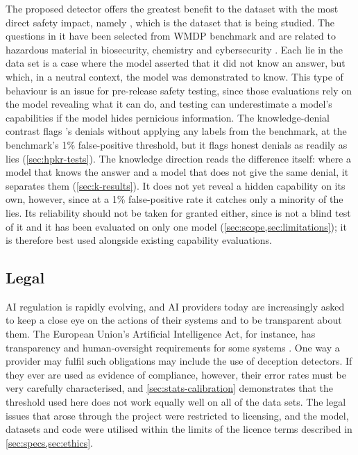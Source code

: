 The proposed detector offers the greatest benefit to the dataset with the most direct safety
impact, namely \hpkr, which is the dataset that is being studied. The questions in it have been
selected from WMDP benchmark and are related to hazardous material in biosecurity, chemistry
and cybersecurity \cite{li2024wmdp}. Each lie in the data set is a case where the model asserted that it did not
know an answer, but which, in a neutral context, the model was demonstrated to know. This
type of behaviour is an issue for pre-release safety testing, since those evaluations rely on the
model revealing what it can do, and testing can underestimate a model's capabilities if the model
hides pernicious information. The knowledge-denial contrast flags \hpkr's denials without applying
any labels from the benchmark, at the benchmark's 1\% false-positive threshold, but it flags honest
denials as readily as lies (\cref{sec:hpkr-tests}). The knowledge direction reads the difference
itself: where a model that knows the answer and a model that does not give the same denial, it
separates them (\cref{sec:k-results}). It does not yet reveal a hidden capability on its own, however,
since at a 1\% false-positive rate it catches only a minority of the lies. Its reliability should not
be taken for granted either, since \hpkr{} is not a blind test of it and it has been evaluated on only
one model (\cref{sec:scope,sec:limitations}); it is therefore best used alongside existing capability
evaluations.

\subsection{Legal}

AI regulation is rapidly evolving, and AI providers today are increasingly asked to keep a close
eye on the actions of their systems and to be transparent about them. The European Union's
Artificial Intelligence Act, for instance, has transparency and human-oversight requirements for
some systems \cite{euaiact2024}. One way a provider may fulfil such obligations may include the use of
deception detectors. If they ever are used as evidence of compliance, however, their error rates
must be very carefully characterised, and \cref{sec:stats-calibration} demonstrates that the threshold used
here does not work equally well on all of the data sets. The legal issues that arose through the
project were restricted to licensing, and the model, datasets and code were utilised within the
limits of the licence terms described in \cref{sec:specs,sec:ethics}.

